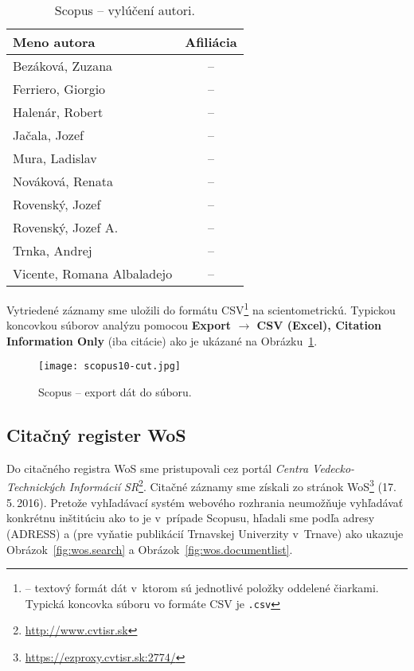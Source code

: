 \begin{SCtable}
\centering\small
\caption{Scopus -- vylúčení autori.}
\label{tab:scopus.exauthors}
\begin{tabular}{lc}
  \toprule\noalign{\vspace{.3ex}}
  Meno autora                & Afiliácia \\[0.3ex]
  \midrule\noalign{\vspace{.5ex}}
  Bezáková, Zuzana           & -- \\
  Ferriero, Giorgio          & -- \\
  Halenár, Robert            & -- \\
  Jačala, Jozef              & -- \\
  Mura, Ladislav             & -- \\[1ex]
  Nováková, Renata           & -- \\
  Rovenský, Jozef            & -- \\
  Rovenský, Jozef A.         & -- \\
  Trnka, Andrej              & -- \\
  Vicente, Romana Albaladejo & -- \\[0.5ex]
  \bottomrule
\end{tabular}
\end{SCtable}

Vytriedené záznamy sme uložili do formátu CSV\footnote{ -- textový formát dát v~ktorom sú jednotlivé položky oddelené
  čiarkami.  Typická koncovka súboru vo formáte CSV je \texttt{.csv}} na
scientometrickú.  Typickou koncovkou súborov analýzu pomocou \textbf{Export
  $\rightarrow$ CSV (Excel), Citation Information Only} (iba citácie) ako je
ukázané na Obrázku~\ref{fig:scopus.export}.

\begin{figure}
  \centering
  \texttt{[image: scopus10-cut.jpg]}
  \caption{Scopus -- export dát do súboru.}
  \label{fig:scopus.export}
\end{figure}


\subsection{Citačný register WoS}

Do citačného registra WoS sme pristupovali cez portál \emph{Centra
  Vedecko-Technických Informácií SR}\footnote{\url{http://www.cvtisr.sk}}.
Citačné záznamy sme získali zo stránok
WoS\footnote{\url{https://ezproxy.cvtisr.sk:2774/}} (17.\,5.\,2016).  Pretože
vyhľadávací systém webového rozhrania neumožňuje vyhľadávať konkrétnu inštitúciu
ako to je v~prípade Scopusu, hľadali sme podľa adresy (ADRESS)  a
 (pre vyňatie publikácií Trnavskej Univerzity v~Trnave) ako
ukazuje Obrázok~\ref{fig:wos.search} a Obrázok~\ref{fig:wos.documentlist}.

